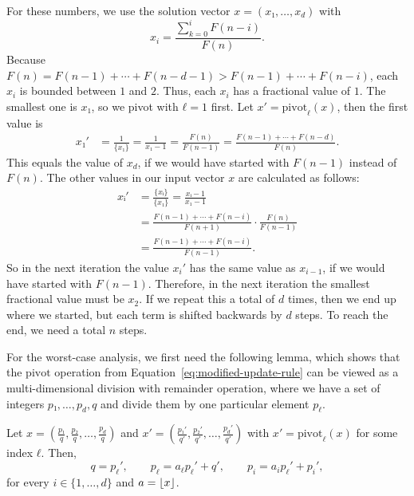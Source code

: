 For these numbers, we use the solution vector $x = (x₁, …, x_d)$ with
\[
  x_i = \frac{\sum_{k=0}^i F(n - i)}{F(n)}.
\]
Because $F(n) = F(n - 1) + ⋯ + F(n - d - 1) > F(n - 1) + ⋯ + F(n - i)$,
each $x_i$ is bounded between $1$ and $2$.
Thus, each $x_i$ has a fractional value of $1$.
The smallest one is $x₁$, so we pivot with $ℓ = 1$ first.
Let $x' = \mathrm{pivot}_ℓ(x)$, then the first value is
\begin{align*}
  x₁' &
  = \frac{1}{\{x₁\}}
  = \frac{1}{x₁ - 1}
  = \frac{F(n)}{F(n - 1)}
  = \frac{F(n - 1) + ⋯ + F(n - d)}{F(n)}.
\end{align*}
This equals the value of $x_d$, if we would have started with $F(n-1)$ instead of $F(n)$.
The other values in our input vector $x$ are calculated as follows:
\begin{align*}
  xᵢ'
  & = \frac{\{xᵢ\}}{\{x₁\}} = \frac{xᵢ - 1}{x₁ - 1} \\
  & = \frac{F(n - 1) + ⋯ + F(n - i)}{F(n + 1)} · \frac{F(n)}{F(n - 1)} \\
  & = \frac{F(n - 1) + ⋯ + F(n - i)}{F(n - 1)}.
\end{align*}
So in the next iteration the value $x_i'$ has the same value as $x_{i-1}$, if we
would have started with $F(n - 1)$.
Therefore, in the next iteration the smallest fractional value must be $x_2$.
If we repeat this a total of $d$ times, then we end up where we started, but
each term is shifted backwards by $d$ steps.
To reach the end, we need a total $n$ steps.


For the worst-case analysis, we first need the following lemma, which shows
that the $\mathrm{pivot}$ operation from Equation~\ref{eq:modified-update-rule}
can be viewed as a multi-dimensional division with remainder operation, where
we have a set of integers $p₁, …, p_d, q$ and divide them by one particular
element $p_ℓ$.

\begin{lemma}
  \label{lem:divmod}
  Let $x = \left(\frac{p₁}{q}, \frac{p₂}{q}, …, \frac{p_d}{q}\right)$
  and $x' = \left(\frac{p₁'}{q'}, \frac{p₂'}{q'}, …, \frac{p_d'}{q'}\right)$
  with $x' = \mathrm{pivot}_ℓ(x)$ for some index $ℓ$.
  Then,
  \[
    q = p_ℓ',
    \qquad
    p_ℓ = a_ℓ p_ℓ' + q',
    \qquad
    p_i = a_i p_ℓ' + p_i',
  \]
  for every $i ∈ \{1, …, d\}$ and $a = \left\lfloor x\right\rfloor$.
\end{lemma}

